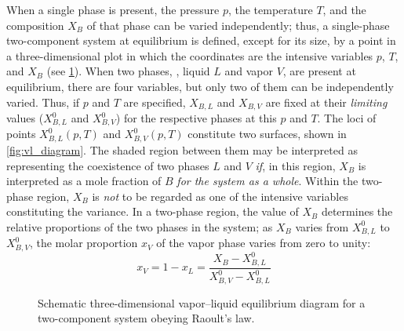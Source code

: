 When a single phase is present, the pressure \(p\), the temperature \(T\), and the composition \(X_B\) of that phase can be varied independently; thus, a single-phase two-component system at equilibrium is defined, except for its size, by a point in a three-dimensional plot in which the coordinates are the intensive variables \(p\), \(T\), and \(X_B\) (see \cref{fig:phase_diagram}).
When two phases, \eg, liquid \(L\) and vapor \(V\), are present at equilibrium, there are four variables, but only two of them can be independently varied. 
Thus, if \(p\) and \(T\) are specified, \(X_{B,L}\) and \(X_{B,V}\) are fixed at their \emph{limiting} values (\(X_{B,L}^0\) and \(X_{B,V}^0\)) for the respective phases at this \(p\) and \(T\). 
The loci of points \(X_{B,L}^0(p, T)\) and \(X_{B,V}^0(p, T)\) constitute two surfaces, shown in \cref{fig:vl_diagram}. 
The shaded region between them may be interpreted as representing the coexistence of two phases \(L\) and \(V\) \emph{if}, in this region, \(X_B\) is interpreted as a mole fraction of \(B\) \emph{for the system as a whole}. 
Within the two-phase region, \(X_B\) is \emph{not} to be regarded as one of the intensive variables constituting the variance.
In a two-phase region, the value of \(X_B\) determines the relative proportions of the two phases in the system; as \(X_B\) varies from \(X_{B,L}^0\) to \(X_{B,V}^0\), the molar proportion \(x_V\) of the vapor phase varies from zero to unity:
\begin{equation}
	x_V = 1 - x_L = \frac{X_B - X_{B,L}^0}{X_{B,V}^0 - X_{B,L}^0}
	\label{eq:vapor_proportion}
\end{equation}

\begin{figure}[htb]
	
	\caption{Schematic three-dimensional vapor--liquid equilibrium diagram for a two-component system obeying Raoult's law.}
	\label{fig:phase_diagram}
\end{figure}


